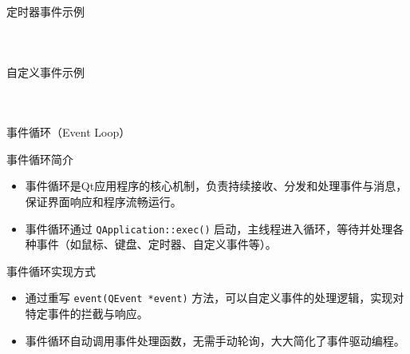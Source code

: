 \documentclass[UTF8,aspectratio=169]{beamer}
\begin{document}
\begin{frame}[fragile]{定时器事件示例}
    \begin{columns}
        \begin{column}{0.48\textwidth}
            \inputminted[firstline=1,lastline=21]{cpp}{code/qt_timer_event_example.cpp}
        \end{column}
        \begin{column}{0.48\textwidth}
            \inputminted[firstline=22,lastline=39]{cpp}{code/qt_timer_event_example.cpp}
        \end{column}
    \end{columns}
\end{frame}

\begin{frame}[fragile]{自定义事件示例}
    \begin{columns}
        \begin{column}{0.48\textwidth}
            \inputminted[firstline=1,lastline=22]{cpp}{code/qt_custom_event_example.cpp}
        \end{column}
        \begin{column}{0.48\textwidth}
            \inputminted[firstline=23,lastline=41]{cpp}{code/qt_custom_event_example.cpp}
        \end{column}
    \end{columns}
\end{frame}

\begin{frame}[fragile]{事件循环（Event Loop）}
    \begin{ytublock}{事件循环简介}
        \begin{itemize}
            \item 事件循环是Qt应用程序的核心机制，负责持续接收、分发和处理事件与消息，保证界面响应和程序流畅运行。
            \item 事件循环通过 \texttt{QApplication::exec()} 启动，主线程进入循环，等待并处理各种事件（如鼠标、键盘、定时器、自定义事件等）。
        \end{itemize}
    \end{ytublock}
    \begin{ytublock}{事件循环实现方式}
        \begin{itemize}
            \item 通过重写 \texttt{event(QEvent *event)} 方法，可以自定义事件的处理逻辑，实现对特定事件的拦截与响应。
            \item 事件循环自动调用事件处理函数，无需手动轮询，大大简化了事件驱动编程。
        \end{itemize}
    \end{ytublock}
\end{frame}
\end{document}
